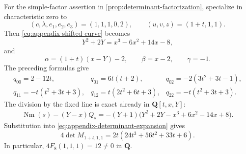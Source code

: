 \documentclass[10pt]{amsart}
\numberwithin{equation}{section}
\theoremstyle{definition}
\theoremstyle{remark}
\newcommand{\QQ}{\mathbf Q}
\newcommand{\Nm}{\operatorname{Nm}}
\begin{document}
For the simple-factor assertion in
\cref{prop:determinant-factorization}, specialize in characteristic zero to
\[
 (c,\lambda,e_1,e_2,e_3)=(1,1,1,0,2),
 \qquad (u,v,z)=(1+t,1,1).
\]
Then \eqref{eq:appendix-shifted-curve} becomes
\[
 Y^2+2Y=x^3-6x^2+14x-8,
\]
and
\[
 \alpha=(1+t)(x-Y)-2,\qquad \beta=x-2,\qquad \gamma=-1.
\]
The preceding formulas give
\[
\begin{array}{lll}
q_{00}=2-12t,&q_{01}=6t(t+2),&q_{02}=-2(3t^2+3t-1),\\
q_{11}=-t(t^2+3t+3),&q_{12}=t(2t^2+6t+3),&
q_{22}=-t(t^2+3t+3).
\end{array}
\]
The division by the fixed line is exact already in $\QQ[t,x,Y]$:
\begin{align*}
 \Nm(s)-(Y-x)Q_s
  =-(Y+1)\bigl(Y^2+2Y-x^3+6x^2-14x+8\bigr).
\end{align*}
Substitution into \eqref{eq:appendix-determinant-expansion} gives
\begin{equation}
 4\det M_{1+t,1,1}=2t(24t^3+56t^2+33t+6).
\label{eq:appendix-simple-structural-factor}
\end{equation}
In particular, $4F_8(1,1,1)=12\ne0$ in $\QQ$.
\end{document}
